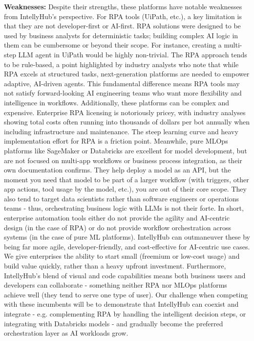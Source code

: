 \documentclass[11pt, a4paper, oneside]{article}
\begin{document}
\textbf{Weaknesses:} Despite their strengths, these platforms have notable weaknesses from IntellyHub's perspective. For RPA tools (UiPath, etc.), a key limitation is that they are not developer-first or AI-first. RPA solutions were designed to be used by business analysts for deterministic tasks; building complex AI logic in them can be cumbersome or beyond their scope. For instance, creating a multi-step LLM agent in UiPath would be highly non-trivial. The RPA approach tends to be rule-based, a point highlighted by industry analysts who note that while RPA excels at structured tasks, next-generation platforms are needed to empower adaptive, AI-driven agents\cite{forresterRPAvsAI}. This fundamental difference means RPA tools may not satisfy forward-looking AI engineering teams who want more flexibility and intelligence in workflows. Additionally, these platforms can be complex and expensive. Enterprise RPA licensing is notoriously pricey, with industry analyses showing total costs often running into thousands of dollars per bot annually when including infrastructure and maintenance. The steep learning curve and heavy implementation effort for RPA is a friction point. Meanwhile, pure MLOps platforms like SageMaker or Databricks are excellent for model development, but are not focused on multi-app workflows or business process integration, as their own documentation confirms\cite{awsSagemaker}. They help deploy a model as an API, but the moment you need that model to be part of a larger workflow (with triggers, other app actions, tool usage by the model, etc.), you are out of their core scope. They also tend to target data scientists rather than software engineers or operations teams - thus, orchestrating business logic with LLMs is not their forte. In short, enterprise automation tools either do not provide the agility and AI-centric design (in the case of RPA) or do not provide workflow orchestration across systems (in the case of pure ML platforms). IntellyHub can outmaneuver these by being far more agile, developer-friendly, and cost-effective for AI-centric use cases. We give enterprises the ability to start small (freemium or low-cost usage) and build value quickly, rather than a heavy upfront investment. Furthermore, IntellyHub's blend of visual and code capabilities means both business users and developers can collaborate - something neither RPA nor MLOps platforms achieve well (they tend to serve one type of user). Our challenge when competing with these incumbents will be to demonstrate that IntellyHub can coexist and integrate - e.g. complementing RPA by handling the intelligent decision steps, or integrating with Databricks models - and gradually become the preferred orchestration layer as AI workloads grow.
\end{document}
